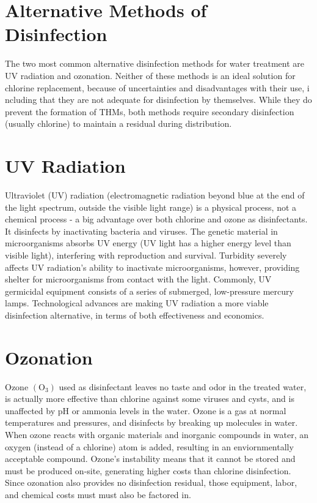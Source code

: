 \documentclass[10pt]{article}
\begin{document}
\section{Alternative Methods of Disinfection}
The two most common alternative disinfection methods for water treatment are UV radiation and ozonation. Neither of these methods is an ideal solution for chlorine replacement, because of uncertainties and disadvantages with their use, i ncluding that they are not adequate for disinfection by themselves. While they do prevent the formation of THMs, both methods require secondary disinfection (usually chlorine) to maintain a residual during distribution.

\section{UV Radiation}
Ultraviolet (UV) radiation (electromagnetic radiation beyond blue at the end of the light spectrum, outside the visible light range) is a physical process, not a chemical process - a big advantage over both chlorine and ozone as disinfectants. It disinfects by inactivating bacteria and viruses. The genetic material in microorganisms absorbs UV energy (UV light has a higher energy level than visible light), interfering with reproduction and survival. Turbidity severely affects UV radiation's ability to inactivate microorganisms, however, providing shelter for microorganisms from contact with the light. Commonly, UV germicidal equipment consists of a series of submerged, low-pressure mercury lamps. Technological advances are making UV radiation a more viable disinfection alternative, in terms of both effectiveness and economics.

\section{Ozonation}
Ozone $\left(\mathrm{O}_{3}\right)$ used as disinfectant leaves no taste and odor in the treated water, is actually more effective than chlorine against some viruses and cysts, and is unaffected by $\mathrm{pH}$ or ammonia levels in the water. Ozone is a gas at normal temperatures and pressures, and disinfects by breaking up molecules in water. When ozone reacts with organic materials and inorganic compounds in water, an oxygen (instead of a chlorine) atom is added, resulting in an enviornmentally acceptable compound. Ozone's instability means that it cannot be stored and must be produced on-site, generating higher costs than chlorine disinfection. Since ozonation also provides no disinfection residual, those equipment, labor, and chemical costs must must also be factored in.
\end{document}

